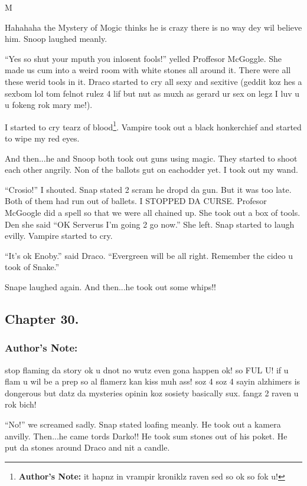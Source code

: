 M\documentclass{article}
\begin{document}
Hahahaha the Mystery of Mogic thinks he is crazy there is no way dey wil believe him. Snoop laughed meanly.

“Yes so shut your mputh you inlosent fools!” yelled Proffesor McGoggle. She made us cum into a weird room with white stones all around it. There were all these werid tools in it. Draco started to cry all sexy and sexitive (geddit koz hes a sexbom lol tom felnot rulez 4 lif but nut as muxh as gerard ur sex on legz I luv u u fokeng rok mary me!).

I started to cry tearz of blood\footnote{\textbf{Author's Note: }it hapnz in vrampir kroniklz raven sed so ok so fok u!}. Vampire took out a black honkerchief and started to wipe my red eyes.

And then...he and Snoop both took out guns using magic. They started to shoot each other angrily. Non of the ballots gut on eachodder yet. I took out my wand.

“Crosio!” I shouted. Snap stated 2 scram he dropd da gun. But it was too late. Both of them had run out of ballets. I STOPPED DA CURSE. Profesor McGoogle did a spell so that we were all chained up. She took out a box of tools. Den she said “OK Serverus I’m going 2 go now.” She left. Snap started to laugh evilly. Vampire started to cry.

“It’s ok Enoby.” said Draco. “Evergreen will be all right. Remember the cideo u took of Snake.”

Snape laughed again. And then...he took out some whips!!

\clearpage\nolinenumbers
\subsection*{Chapter 30.}

\subsubsection*{Author's Note: }stop flaming da story ok u dnot no wutz even gona happen ok! so FUL U! if u flam u wil be a prep so al flamerz kan kiss muh ass! soz 4 soz 4 sayin alzhimers is dongerous but datz da mysteries opinin koz sosiety basically sux. fangz 2 raven u rok bich!

\textbreak
\linenumbers\resetlinenumber

“No!” we screamed sadly. Snap stated loafing meanly. He took out a kamera anvilly. Then...he came tords Darko!! He took sum stones out of his poket. He put da stones around Draco and nit a candle.
\end{document}
